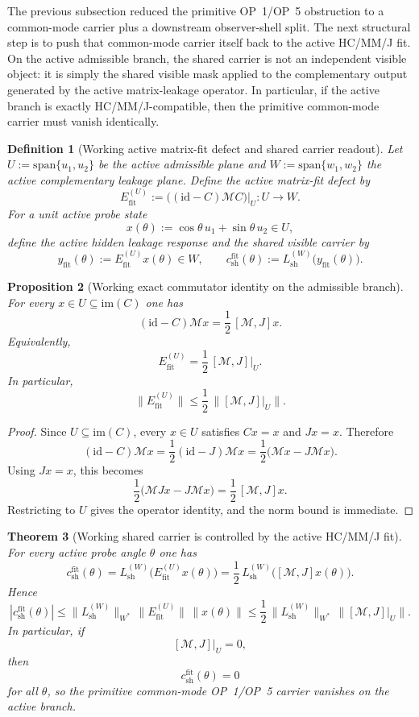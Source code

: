 \documentclass[12pt,a4paper]{article}
\newtheorem{theorem}{Theorem}[section]
\newtheorem{proposition}[theorem]{Proposition}
\newtheorem{definition}[theorem]{Definition}
\begin{document}
The previous subsection reduced the primitive OP~1/OP~5 obstruction to a common-mode carrier plus a downstream observer-shell split. The next structural step is to push that common-mode carrier itself back to the active HC/MM/J fit. On the active admissible branch, the shared carrier is not an independent visible object: it is simply the shared visible mask applied to the complementary output generated by the active matrix-leakage operator. In particular, if the active branch is exactly HC/MM/J-compatible, then the primitive common-mode carrier must vanish identically.

\begin{definition}[Working active matrix-fit defect and shared carrier readout]
Let $U:=\mathrm{span}\{u_1,u_2\}$ be the active admissible plane and $W:=\mathrm{span}\{w_1,w_2\}$ the active complementary leakage plane. Define the active matrix-fit defect by
\[
 E_{\mathrm{fit}}^{(U)} := \bigl((\mathrm{id}-C)\mathcal M C\bigr)\big|_{U}: U\to W.
\]
For a unit active probe state
\[
 x(\theta):=\cos\theta\,u_1+\sin\theta\,u_2\in U,
\]
define the active hidden leakage response and the shared visible carrier by
\[
 y_{\mathrm{fit}}(\theta):=E_{\mathrm{fit}}^{(U)}x(\theta)\in W,
 \qquad
 c_{\mathrm{sh}}^{\mathrm{fit}}(\theta):=L_{\mathrm{sh}}^{(W)}\bigl(y_{\mathrm{fit}}(\theta)\bigr).
\]
\end{definition}

\begin{proposition}[Working exact commutator identity on the admissible branch]
For every $x\in U\subseteq \mathrm{im}(C)$ one has
\[
 (\mathrm{id}-C)\mathcal M x
 =
 \frac12\,[\mathcal M,J]x.
\]
Equivalently,
\[
 E_{\mathrm{fit}}^{(U)}
 =
 \frac12\,[\mathcal M,J]\big|_{U}.
\]
In particular,
\[
 \|E_{\mathrm{fit}}^{(U)}\|
 \le
 \frac12\,\|[\mathcal M,J]\big|_{U}\|.
\]
\end{proposition}

\begin{proof}
Since $U\subseteq \mathrm{im}(C)$, every $x\in U$ satisfies $Cx=x$ and $Jx=x$. Therefore
\[
 (\mathrm{id}-C)\mathcal M x
 =
 \frac12(\mathrm{id}-J)\mathcal M x
 =
 \frac12\bigl(\mathcal Mx-J\mathcal Mx\bigr).
\]
Using $Jx=x$, this becomes
\[
 \frac12\bigl(\mathcal MJx-J\mathcal Mx\bigr)
 =
 \frac12\,[\mathcal M,J]x.
\]
Restricting to $U$ gives the operator identity, and the norm bound is immediate.
\end{proof}

\begin{theorem}[Working shared carrier is controlled by the active HC/MM/J fit]
For every active probe angle $\theta$ one has
\[
 c_{\mathrm{sh}}^{\mathrm{fit}}(\theta)
 =
 L_{\mathrm{sh}}^{(W)}\bigl(E_{\mathrm{fit}}^{(U)}x(\theta)\bigr)
 =
 \frac12\,L_{\mathrm{sh}}^{(W)}\bigl([\mathcal M,J]x(\theta)\bigr).
\]
Hence
\[
 |c_{\mathrm{sh}}^{\mathrm{fit}}(\theta)|
 \le
 \|L_{\mathrm{sh}}^{(W)}\|_{W^*}\,\|E_{\mathrm{fit}}^{(U)}\|\,\|x(\theta)\|
 \le
 \frac12\,\|L_{\mathrm{sh}}^{(W)}\|_{W^*}\,\|[\mathcal M,J]\big|_{U}\|.
\]
In particular, if
\[
 [\mathcal M,J]\big|_{U}=0,
\]
then
\[
 c_{\mathrm{sh}}^{\mathrm{fit}}(\theta)=0
\]
for all $\theta$, so the primitive common-mode OP~1/OP~5 carrier vanishes on the active branch.
\end{theorem}
\end{document}
